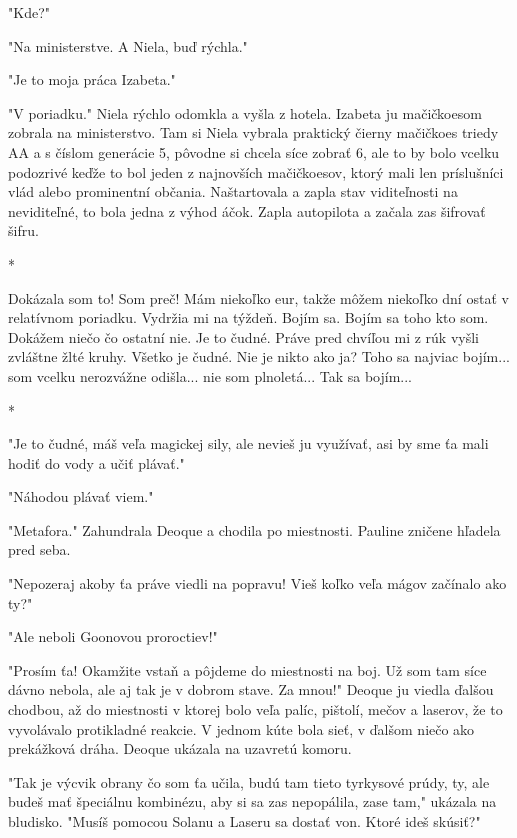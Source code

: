 \documentclass{book}
\begin{document}
"$ $Kde?"

"$ $Na ministerstve. A Niela, buď rýchla."

"$ $Je to moja práca Izabeta."

"$ $V poriadku."$ $ Niela rýchlo odomkla a vyšla z hotela. Izabeta ju mačičkoesom zobrala na ministerstvo. Tam si Niela vybrala praktický čierny mačičkoes triedy AA a s číslom generácie 5, pôvodne si chcela síce zobrať 6, ale to by bolo vcelku podozrivé keďže to bol jeden z najnovších mačičkoesov, ktorý mali len príslušníci vlád alebo prominentní občania. Naštartovala a zapla stav viditeľnosti na neviditeľné, to bola jedna z výhod áčok. Zapla autopilota a začala zas šifrovať šifru.

\begin{center}
*
\end{center}

Dokázala som to! Som preč! Mám niekoľko eur, takže môžem niekoľko dní ostať v relatívnom poriadku. Vydržia mi na týždeň. Bojím sa. Bojím sa toho kto som. Dokážem niečo čo ostatní nie. Je to čudné. Práve pred chvíľou mi z rúk vyšli zvláštne žlté kruhy. Všetko je čudné. Nie je nikto ako ja? Toho sa najviac bojím... som vcelku nerozvážne odišla... nie som plnoletá... Tak sa bojím...

\begin{center}
*
\end{center}

"$ $Je to čudné, máš veľa magickej sily, ale nevieš ju využívať, asi by sme ťa mali hodiť do vody a učiť plávať."

"$ $Náhodou plávať viem."

"$ $Metafora."$ $ Zahundrala Deoque a chodila po miestnosti. Pauline zničene hľadela pred seba.

"$ $Nepozeraj akoby ťa práve viedli na popravu! Vieš koľko veľa mágov začínalo ako ty?"

"$ $Ale neboli Goonovou proroctiev!"

"$ $Prosím ťa! Okamžite vstaň a pôjdeme do miestnosti na boj. Už som tam síce dávno nebola, ale aj tak je v dobrom stave. Za mnou!"$ $ Deoque ju viedla ďalšou chodbou, až do miestnosti v ktorej bolo veľa palíc, pištolí, mečov a laserov, že to vyvolávalo protikladné reakcie. V jednom kúte bola sieť, v ďalšom niečo ako prekážková dráha. Deoque ukázala na uzavretú komoru.

"$ $Tak je výcvik obrany čo som ťa učila, budú tam tieto tyrkysové prúdy, ty, ale budeš mať špeciálnu kombinézu, aby si sa zas nepopálila, zase tam,"$ $ ukázala na bludisko. "$ $Musíš pomocou Solanu a Laseru sa dostať von. Ktoré ideš skúsiť?"
\end{document}
